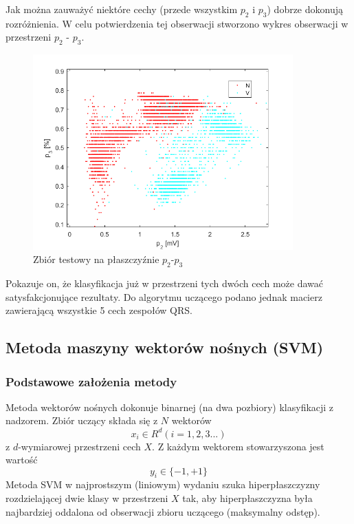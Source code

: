 \documentclass[[10pt,a4paper]{article}
\begin{document}
Jak można zauważyć niektóre cechy (przede wszystkim $p_2$ i $p_3$) dobrze dokonują rozróżnienia. W celu potwierdzenia tej obserwacji stworzono wykres obserwacji w przestrzeni $p_2$ - $p_3$.

\begin{figure}[H]
	\begin{center}
		\includegraphics[width=10cm]{p2p3.png}
		\caption{Zbiór testowy na płaszczyźnie $p_2$-$p_3$}
	\end{center}
\end{figure}


Pokazuje on, że klasyfikacja już w przestrzeni tych dwóch cech może dawać satysfakcjonujące rezultaty. Do algorytmu uczącego podano jednak macierz zawierającą wszystkie 5 cech zespołów QRS.
\subsection{Metoda maszyny wektorów nośnych (SVM)}
\subsubsection{Podstawowe założenia metody}
Metoda wektorów nośnych dokonuje binarnej (na dwa pozbiory) klasyfikacji z nadzorem. Zbiór uczący składa się z $N$ wektorów
\begin{equation}
x_i \in R^d (i = 1, 2, 3...)
\end{equation}
z $d$-wymiarowej przestrzeni cech $X$. Z każdym wektorem stowarzyszona jest wartość
\begin{equation}
y_i \in \{-1, +1\}
\end{equation}
Metoda SVM w najprostszym (liniowym) wydaniu szuka hiperpłaszczyzny rozdzielającej dwie klasy w przestrzeni $X$ tak, aby hiperpłaszczyzna była najbardziej oddalona od obserwacji zbioru uczącego (maksymalny odstęp).
\end{document}
